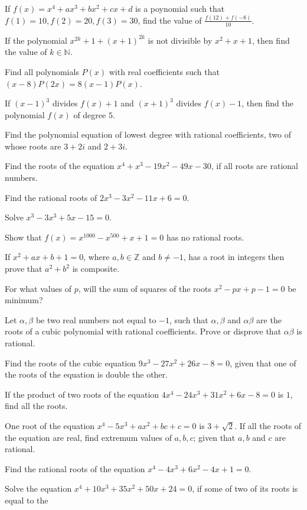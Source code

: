 \item If $f(x) = x^4 + ax^3 + bx^2 + cx + d$ is a poynomial such that $f(1) = 10, f(2) = 20, f(3) = 30$,
  find the value of $\frac{f(12) + f(-8)}{10}$.
\item If the polynomial $x^{2k} + 1 + (x + 1)^{2k}$ is not divisible by $x^2 + x + 1$, then find the value
  of $k\in\mathbb{N}$.
\item Find all polynomials $P(x)$ with real coefficients such that $(x - 8)P(2x) = 8(x - 1)P(x)$.
\item If $(x - 1)^3$ divides $f(x) + 1$ and $(x + 1)^3$ divides $f(x) - 1$, then find the polynomial $f(x)$
  of degree $5$.
\item Find the polynomial equation of lowest degree with rational coefficients, two of whose roots are $3 +
  2i$ and $2 + 3i$.
\item Find the roots of the equation $x^4 + x^3 -19x^2 - 49x - 30$, if all roots are rational numbers.
\item Find the rational roots of $2x^3 - 3x^2 - 11x + 6 = 0$.
\item Solve $x^3 - 3x^3 + 5x - 15 = 0$.
\item Show that $f(x) = x^{1000} - x^{500} + x + 1 = 0$ has no rational roots.
\item If $x^2 + ax + b + 1 = 0$, where $a, b\in\mathbb{Z}$ and $b\neq -1$, has a root in integers then prove
  that $a^2 + b^2$ is composite.
\item For what values of $p$, will the sum of squares of the roots $x^2 - px + p - 1 = 0$ be minimum?
\item Let $\alpha, \beta$ be two real numbers not equal to $-1$, such that $\alpha, \beta$ and $\alpha\beta$
  are the roots of a cubic polynomial with rational coefficients. Prove or disprove that $\alpha\beta$ is
  rational.
\item Find the roots of the cubic equation $9x^3 - 27x^2 + 26x - 8 = 0$, given that one of the roots of the
  equation is double the other.
\item If the product of two roots of the equation $4x^4 - 24x^3 + 31x^2 + 6x - 8 = 0$ is $1$, find all the
  roots.
\item One root of the equation $x^4 - 5x^3 + ax^2 + bc + c = 0$ is $3 + \sqrt{2}$. If all the roots of the
  equation are real, find extremum values of $a, b, c$; given that $a, b$ and $c$ are rational.
\item Find the rational roots of the equation $x^4 - 4x^3 + 6x^2 - 4x + 1 = 0$.
\item Solve the equation $x^4 + 10x^3 + 35x^2 + 50x + 24 = 0$, if some of two of its roots is equal to the
